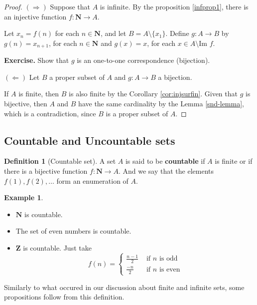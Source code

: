 \documentclass[12pt,a4paper]{article}
\theoremstyle{definition}
\newtheorem{example}{Example}[section]
\newtheorem{definition}{Definition}[section]
\begin{document}
\begin{proof}
	$(\Rightarrow)$ Suppose that $A$ is infinite. By the proposition \ref{infprop1}, there is an injective function $f : \textbf{N} \longrightarrow A$.
	
	Let $x_n = f(n)$ for each $n \in \textbf{N}$, and let $B = A \setminus \{ x_1 \}$. Define $g : A \longrightarrow B$ by $g(n) = x_{n+1}$, for each $n \in \textbf{N}$ and $g(x) = x$, for each $x \in A \setminus \text{Im } f$.
	
	\textbf{Exercise.} Show that $g$ is an one-to-one correspondence (bijection).
	
	$(\Leftarrow)$ Let $B$ a proper subset of $A$ and $g : A \longrightarrow B$ a bijection.
	
	If $A$ is finite, then $B$ is also finite by the Corollary \ref{cor:injsurfin}. Given that $g$ is bijective, then $A$ and $B$ have the same cardinality by the Lemma \ref{snd-lemma}, which is a contradiction, since $B$ is a proper subset of $A$.
\end{proof}

\subsection{Countable and Uncountable sets}

\begin{definition}[Countable set]
	A set $A$ is said to be \textbf{countable} if $A$ is finite or if there is a bijective function $f : \textbf{N} \longrightarrow A$. And we say that the elements $f(1), f(2), \ldots$ form an enumeration of $A$.
\end{definition}

\begin{example} \hfill
	\begin{itemize}
		\item $\textbf{N}$ is countable.
		\item The set of even numbers is countable.
		\item $\textbf{Z}$ is countable. Just take \[ f(n) = \begin{cases} 
      \frac{n-1}{2} & \text{ if } n \text{ is odd} \\
      \frac{-n}{2} & \text{ if } n \text{ is even}
   \end{cases} \]
	\end{itemize}
\end{example}

Similarly to what occured in our discussion about finite and infinite sets, some propositions follow from this definition.
\end{document}
